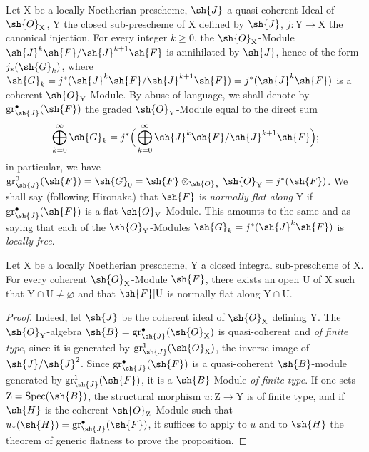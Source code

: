 \begin{env}[6.10.1]
\label{IV.6.10.1}
Let $\mathrm{X}$ be a locally Noetherian prescheme, $\sh{J}$ a quasi-coherent Ideal of $\sh{O}_\mathrm{X}$, $\mathrm{Y}$ the closed sub-prescheme of $\mathrm{X}$ defined by $\sh{J}$, $j:\mathrm{Y}\to\mathrm{X}$ the canonical injection. For every integer $k\geqslant 0$, the $\sh{O}_\mathrm{X}$-Module $\sh{J}^k\sh{F}/\sh{J}^{k+1}\sh{F}$ is annihilated by $\sh{J}$, hence of the form $j_*(\sh{G}_k)$, where $\sh{G}_k=j^*(\sh{J}^k\sh{F}/\sh{J}^{k+1}\sh{F})=j^*(\sh{J}^k\sh{F})$ is a coherent $\sh{O}_\mathrm{Y}$-Module. By abuse of language, we shall denote by $\operatorname{gr}^{\bullet}_\sh{J}(\sh{F})$ the graded $\sh{O}_\mathrm{Y}$-Module equal to the direct sum
\[
\bigoplus_{k=0}^{\infty}\sh{G}_k = j^*\Big(\bigoplus_{k=0}^{\infty}\sh{J}^k\sh{F}/\sh{J}^{k+1}\sh{F}\Big);
\]
  in particular, we have $\operatorname{gr}^0_\sh{J}(\sh{F})=\sh{G}_0=\sh{F}\otimes_{\sh{O}_\mathrm{X}}\sh{O}_\mathrm{Y}=j^*(\sh{F})$. We shall say (following Hironaka) that $\sh{F}$ is \emph{normally flat along} $\mathrm{Y}$ if $\operatorname{gr}^{\bullet}_\sh{J}(\sh{F})$ is a flat $\sh{O}_\mathrm{Y}$-Module. This amounts to the same  and  as saying that each of the $\sh{O}_\mathrm{Y}$-Modules $\sh{G}_k=j^*(\sh{J}^k\sh{F})$ is \emph{locally free}.
\end{env}

\begin{proposition}[6.10.2]
\label{IV.6.10.2}
Let $\mathrm{X}$ be a locally Noetherian prescheme, $\mathrm{Y}$ a closed integral sub-prescheme of $\mathrm{X}$. For every coherent $\sh{O}_\mathrm{X}$-Module $\sh{F}$, there exists an open $\mathrm{U}$ of $\mathrm{X}$ such that $\mathrm{Y}\cap\mathrm{U}\neq\varnothing$ and that $\sh{F}|\mathrm{U}$ is normally flat along $\mathrm{Y}\cap\mathrm{U}$.
\end{proposition}

\begin{proof}
Indeed, let $\sh{J}$ be the coherent ideal of $\sh{O}_\mathrm{X}$ defining $\mathrm{Y}$. The $\sh{O}_\mathrm{Y}$-algebra $\sh{B}=\operatorname{gr}^{\bullet}_\sh{J}(\sh{O}_\mathrm{X})$ is quasi-coherent and \emph{of finite type}, since it is generated by $\operatorname{gr}^1_\sh{J}(\sh{O}_\mathrm{X})$, the inverse image of $\sh{J}/\sh{J}^2$. Since $\operatorname{gr}^{\bullet}_\sh{J}(\sh{F})$ is a quasi-coherent $\sh{B}$-module generated by $\operatorname{gr}^1_\sh{J}(\sh{F})$, it is a $\sh{B}$-Module \emph{of finite type}. If one sets $\mathrm{Z}=\operatorname{Spec}(\sh{B})$, the structural morphism $u:\mathrm{Z}\to\mathrm{Y}$ is of finite type, and if $\sh{H}$ is the coherent $\sh{O}_\mathrm{Z}$-Module such that $u_*(\sh{H})=\operatorname{gr}^{\bullet}_\sh{J}(\sh{F})$, it suffices to apply to $u$ and to $\sh{H}$ the theorem of generic flatness  to prove the proposition.
\end{proof}

